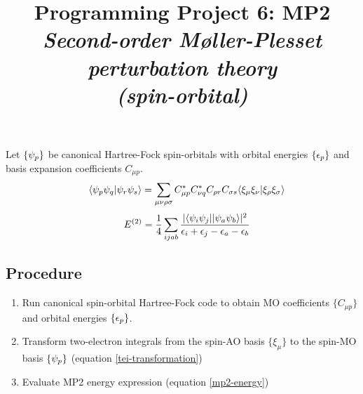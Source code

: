 \documentclass[fleqn]{article}
\title{Programming Project 6: MP2\\
\textit{Second-order M\o ller-Plesset perturbation theory\\(spin-orbital)}}
\author{}
\date{}
\begin{document}
\maketitle
\vspace{-1cm}
\noindent
Let $\{\psi_p\}$ be canonical Hartree-Fock spin-orbitals with orbital energies $\{\epsilon_p\}$ and basis expansion coefficients $C_{\mu p}$.
\begin{align}
\label{tei-transformation}
&&
  \langle\psi_p\psi_q|\psi_r\psi_s\rangle
=
  \sum_{\mu\nu\rho\sigma}
  C_{\mu p}^*C_{\nu q}^* C_{\rho r}C_{\sigma s}
  \langle\xi_\mu\xi_\nu|\xi_\rho\xi_\sigma\rangle
\end{align}
\begin{align}
\label{mp2-energy}
&&
  E^{(2)}
=
  \dfrac{1}{4}
  \sum_{ijab}
  \dfrac{|\langle\psi_i\psi_j||\psi_a\psi_b\rangle|^2}{\epsilon_i+\epsilon_j-\epsilon_a-\epsilon_b}
\end{align}


\subsection*{Procedure}

\begin{enumerate}
  \item Run canonical spin-orbital Hartree-Fock code to obtain MO coefficients $\{C_{\mu p}\}$ and orbital energies $\{\epsilon_p\}$.
  \item Transform two-electron integrals from the spin-AO basis $\{\xi_\mu\}$ to the spin-MO basis $\{\psi_p\}$ (equation \ref{tei-transformation})
  \item Evaluate MP2 energy expression (equation \ref{mp2-energy})
\end{enumerate}
\end{document}
